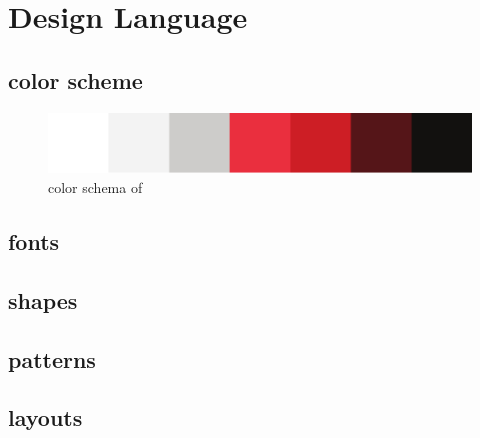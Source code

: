 \section{Design Language}

\subsection{color scheme}

\begin{figure}[htb]
    \centering
    \includegraphics[width=\textwidth]{gfx/color_schema.pdf}
    \caption{color schema of \projectname{}}
    \label{fig:color_schema}
\end{figure}




\subsection{fonts}


\subsection{shapes}


\subsection{patterns}


\subsection{layouts}
